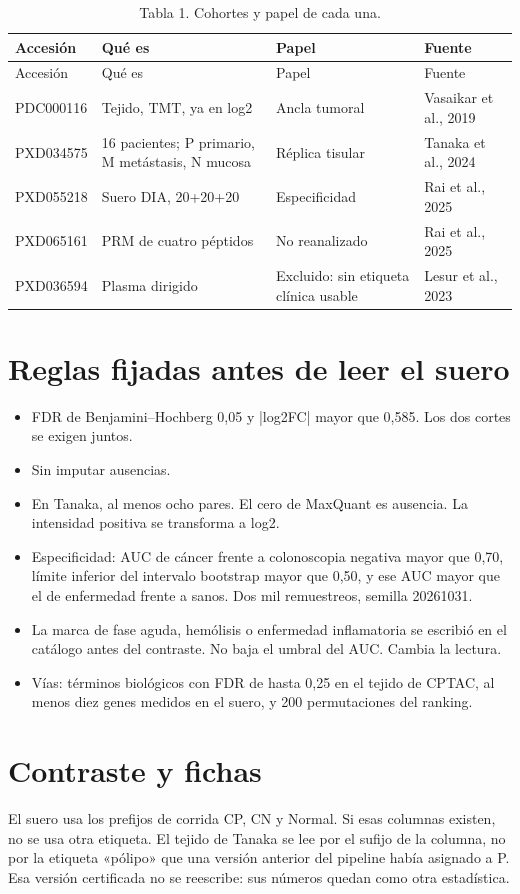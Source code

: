 \documentclass[12pt,oneside]{report}
\begin{document}
\begin{longtable}{p{3.88cm} p{3.88cm} p{3.88cm} p{3.88cm}}
\caption{Tabla 1. Cohortes y papel de cada una.}\\
\toprule
Accesión & Qué es & Papel & Fuente\\
\midrule
\endfirsthead
\toprule
Accesión & Qué es & Papel & Fuente\\
\midrule
\endhead
PDC000116 & Tejido, TMT, ya en log2 & Ancla tumoral & Vasaikar et al., 2019\\
PXD034575 & 16 pacientes; P primario, M metástasis, N mucosa & Réplica tisular & Tanaka et al., 2024\\
PXD055218 & Suero DIA, 20+20+20 & Especificidad & Rai et al., 2025\\
PXD065161 & PRM de cuatro péptidos & No reanalizado & Rai et al., 2025\\
PXD036594 & Plasma dirigido & Excluido: sin etiqueta clínica usable & Lesur et al., 2023\\
\bottomrule
\end{longtable}
\section{Reglas fijadas antes de leer el suero}
\begin{itemize}
\item FDR de Benjamini–Hochberg 0,05 y |log2FC| mayor que 0,585. Los dos cortes se exigen juntos.
\item Sin imputar ausencias.
\item En Tanaka, al menos ocho pares. El cero de MaxQuant es ausencia. La intensidad positiva se transforma a log2.
\item Especificidad: AUC de cáncer frente a colonoscopia negativa mayor que 0,70, límite inferior del intervalo bootstrap mayor que 0,50, y ese AUC mayor que el de enfermedad frente a sanos. Dos mil remuestreos, semilla 20261031.
\item La marca de fase aguda, hemólisis o enfermedad inflamatoria se escribió en el catálogo antes del contraste. No baja el umbral del AUC. Cambia la lectura.
\item Vías: términos biológicos con FDR de hasta 0,25 en el tejido de CPTAC, al menos diez genes medidos en el suero, y 200 permutaciones del ranking.
\end{itemize}
\section{Contraste y fichas}
El suero usa los prefijos de corrida CP, CN y Normal. Si esas columnas existen, no se usa otra etiqueta. El tejido de Tanaka se lee por el sufijo de la columna, no por la etiqueta «pólipo» que una versión anterior del pipeline había asignado a P. Esa versión certificada no se reescribe: sus números quedan como otra estadística.
\end{document}
